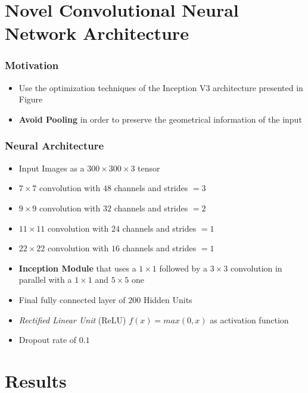 \documentclass[a0, portrait]{IWIposter}
\begin{document}
\begin{multicols}{3}

\section*{Novel Convolutional Neural Network Architecture}

\centering
\subsubsection*{Motivation}
	\begin{itemize}
		\item Use the optimization techniques of the Inception V3 architecture presented in Figure
		\item \textbf{Avoid Pooling} in order to preserve the geometrical information of the input

	\end{itemize}

\centering
\subsubsection*{Neural Architecture}
	\begin{itemize}
	\item Input Images as a $300 \times 300 \times 3$ tensor
	\item $7 \times 7$ convolution with $48$ channels and strides $= 3$
	\item $9 \times 9$ convolution with $32$ channels and strides $= 2$ 
	\item $11 \times 11$ convolution with $24$ channels and strides $= 1$ 
	\item $22 \times 22$ convolution with $16$ channels and strides $= 1$ 
	\item \textbf{Inception Module} that uses a $1 \times 1$ followed by a $3 \times 3$ convolution in parallel with a $1 \times 1$ and $5 \times 5$ one
	\item Final fully connected layer of $200$ Hidden Units
	\item \textit{Rectified Linear Unit} (ReLU) $f(x) = max(0,x)$ as activation function
	\item Dropout rate of $0.1$

	\end{itemize}


\section*{Results}


\end{multicols}
\end{document}
